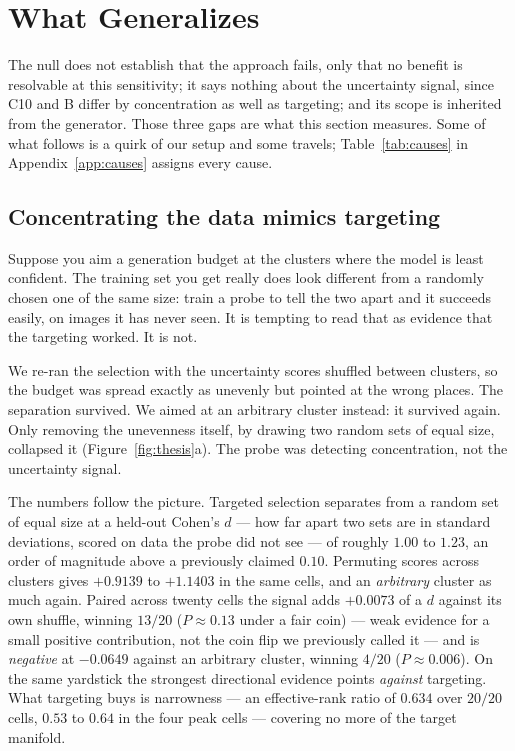 \documentclass{article} %
\begin{document}
\section{What Generalizes}
\label{sec:dissection}

The null does not establish that the approach fails, only that no benefit is resolvable at this
sensitivity; it says nothing about the uncertainty signal, since C10 and B differ by concentration
as well as targeting; and its scope is inherited from the generator. Those three gaps are what this section measures. Some of what follows is a quirk of our setup and
some travels; Table~\ref{tab:causes} in Appendix~\ref{app:causes} assigns every cause.

\subsection{Concentrating the data mimics targeting}
\label{sec:diss-signal}

Suppose you aim a generation budget at the clusters where the model is least confident. The training
set you get really does look different from a randomly chosen one of the same size: train a probe to
tell the two apart and it succeeds easily, on images it has never seen. It is tempting to read that
as evidence that the targeting worked. It is not.

We re-ran the selection with the uncertainty scores shuffled between clusters, so the budget was
spread exactly as unevenly but pointed at the wrong places. The separation survived. We aimed at an
arbitrary cluster instead: it survived again. Only removing the unevenness itself, by drawing two
random sets of equal size, collapsed it (Figure~\ref{fig:thesis}a). The probe was detecting
concentration, not the uncertainty signal.

The numbers follow the picture. Targeted selection separates from a random set of equal size at a
held-out Cohen's $d$ --- how far apart two sets are in standard deviations, scored on data the probe
did not see --- of roughly $1.00$ to $1.23$, an order of magnitude above a previously claimed
$0.10$. Permuting scores across clusters gives $+0.9139$ to $+1.1403$ in the same cells, and an
\emph{arbitrary} cluster as much again. Paired across twenty cells the signal adds $+0.0073$ of a
$d$ against its own shuffle, winning $13/20$ ($P \approx 0.13$ under a fair coin) --- weak evidence
for a small positive contribution, not the coin flip we previously called it --- and is
\emph{negative} at $-0.0649$ against an arbitrary cluster, winning $4/20$ ($P \approx 0.006$). On the
same yardstick the strongest directional evidence points \emph{against} targeting. What targeting
buys is narrowness --- an effective-rank ratio of $0.634$ over $20/20$ cells, $0.53$ to $0.64$ in
the four peak cells --- covering no more of the target manifold.
\end{document}
